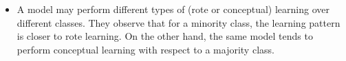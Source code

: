 \documentclass{article}
\begin{document}
\begin{itemize}
    \item A model may perform different types of (rote or conceptual) learning over different classes. They observe that for a minority class, the learning pattern is closer to rote learning. On the other hand, the same model tends to perform conceptual learning with respect to a majority class. 
\end{itemize}
\end{document}
